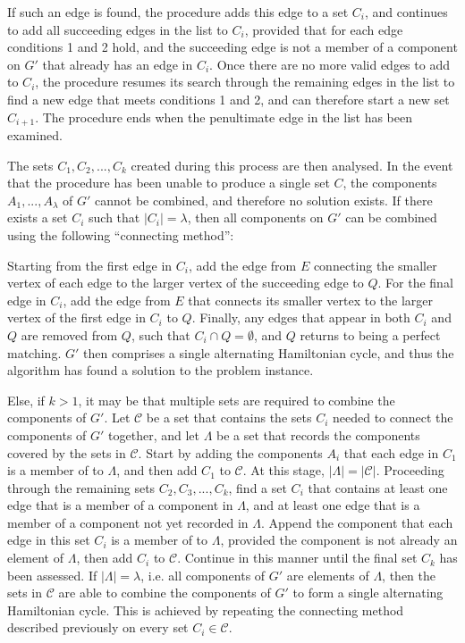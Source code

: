 \documentclass[oribibl]{llncs}
\begin{document}
If such an edge is found, the procedure adds this edge to a set $C_i$, and continues to add all succeeding edges in the list to $C_i$, provided that for each edge conditions 1 and 2 hold, and the succeeding edge is not a member of a component on $G'$ that already has an edge in $C_i$. Once there are no more valid edges to add to $C_i$, the procedure resumes its search through the remaining edges in the list to find a new edge that meets conditions 1 and 2, and can therefore start a new set $C_{i+1}$. The procedure ends when the penultimate edge in the list has been examined.

The sets $C_1, C_2, ..., C_k$ created during this process are then analysed. In the event that the procedure has been unable to produce a single set $C$, the components $A_1,..., A_{\lambda}$ of $G'$ cannot be combined, and therefore no solution exists. If there exists a set $C_i$ such that $|C_i| = \lambda$, then all components on $G'$ can be combined using the following ``connecting method'':

Starting from the first edge in $C_i$, add the edge from $E$ connecting the smaller vertex of each edge to the larger vertex of the succeeding edge to $Q$. For the final edge in $C_i$, add the edge from $E$ that connects its smaller vertex to the larger vertex of the first edge in $C_i$ to $Q$. Finally, any edges that appear in both $C_i$ and $Q$ are removed from $Q$, such that $C_i \cap Q = \emptyset$, and $Q$ returns to being a perfect matching. $G'$ then comprises a single alternating Hamiltonian cycle, and thus the algorithm has found a solution to the problem instance.


Else, if $k > 1$, it may be that multiple sets are required to combine the components of $G'$. Let $\mathcal{C}$ be a set that contains the sets $C_i$ needed to connect the components of $G'$ together, and let $\Lambda$ be a set that records the components covered by the sets in $\mathcal{C}$. Start by adding the components $A_i$ that each edge in $C_1$ is a member of to $\Lambda$, and then add $C_1$ to $\mathcal{C}$. At this stage, $|\Lambda| = |\mathcal{C}|$. Proceeding through the remaining sets $C_2, C_3, ..., C_k$, find a set $C_i$ that contains at least one edge that is a member of a component in $\Lambda$, and at least one edge that is a member of a component not yet recorded in $\Lambda$. Append the component that each edge in this set $C_i$ is a member of to $\Lambda$, provided the component is not already an element of $\Lambda$, then add $C_i$ to $\mathcal{C}$. Continue in this manner until the final set $C_k$ has been assessed. If $|\Lambda| = \lambda$, i.e. all components of $G'$ are elements of $\Lambda$, then the sets in $\mathcal{C}$ are able to combine the components of $G'$ to form a single alternating Hamiltonian cycle. This is achieved by repeating the connecting method described previously on every set $C_i \in \mathcal{C}$.
\end{document}
